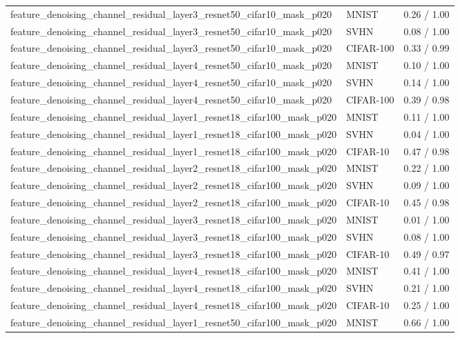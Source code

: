 \begin{tabular}{lll}
feature\_denoising\_channel\_residual\_layer3\_resnet50\_cifar10\_mask\_p020 & MNIST & 0.26 / 1.00 \\
feature\_denoising\_channel\_residual\_layer3\_resnet50\_cifar10\_mask\_p020 & SVHN & 0.08 / 1.00 \\
feature\_denoising\_channel\_residual\_layer3\_resnet50\_cifar10\_mask\_p020 & CIFAR-100 & 0.33 / 0.99 \\
feature\_denoising\_channel\_residual\_layer4\_resnet50\_cifar10\_mask\_p020 & MNIST & 0.10 / 1.00 \\
feature\_denoising\_channel\_residual\_layer4\_resnet50\_cifar10\_mask\_p020 & SVHN & 0.14 / 1.00 \\
feature\_denoising\_channel\_residual\_layer4\_resnet50\_cifar10\_mask\_p020 & CIFAR-100 & 0.39 / 0.98 \\
feature\_denoising\_channel\_residual\_layer1\_resnet18\_cifar100\_mask\_p020 & MNIST & 0.11 / 1.00 \\
feature\_denoising\_channel\_residual\_layer1\_resnet18\_cifar100\_mask\_p020 & SVHN & 0.04 / 1.00 \\
feature\_denoising\_channel\_residual\_layer1\_resnet18\_cifar100\_mask\_p020 & CIFAR-10 & 0.47 / 0.98 \\
feature\_denoising\_channel\_residual\_layer2\_resnet18\_cifar100\_mask\_p020 & MNIST & 0.22 / 1.00 \\
feature\_denoising\_channel\_residual\_layer2\_resnet18\_cifar100\_mask\_p020 & SVHN & 0.09 / 1.00 \\
feature\_denoising\_channel\_residual\_layer2\_resnet18\_cifar100\_mask\_p020 & CIFAR-10 & 0.45 / 0.98 \\
feature\_denoising\_channel\_residual\_layer3\_resnet18\_cifar100\_mask\_p020 & MNIST & 0.01 / 1.00 \\
feature\_denoising\_channel\_residual\_layer3\_resnet18\_cifar100\_mask\_p020 & SVHN & 0.08 / 1.00 \\
feature\_denoising\_channel\_residual\_layer3\_resnet18\_cifar100\_mask\_p020 & CIFAR-10 & 0.49 / 0.97 \\
feature\_denoising\_channel\_residual\_layer4\_resnet18\_cifar100\_mask\_p020 & MNIST & 0.41 / 1.00 \\
feature\_denoising\_channel\_residual\_layer4\_resnet18\_cifar100\_mask\_p020 & SVHN & 0.21 / 1.00 \\
feature\_denoising\_channel\_residual\_layer4\_resnet18\_cifar100\_mask\_p020 & CIFAR-10 & 0.25 / 1.00 \\
feature\_denoising\_channel\_residual\_layer1\_resnet50\_cifar100\_mask\_p020 & MNIST & 0.66 / 1.00 \\

\end{tabular}
